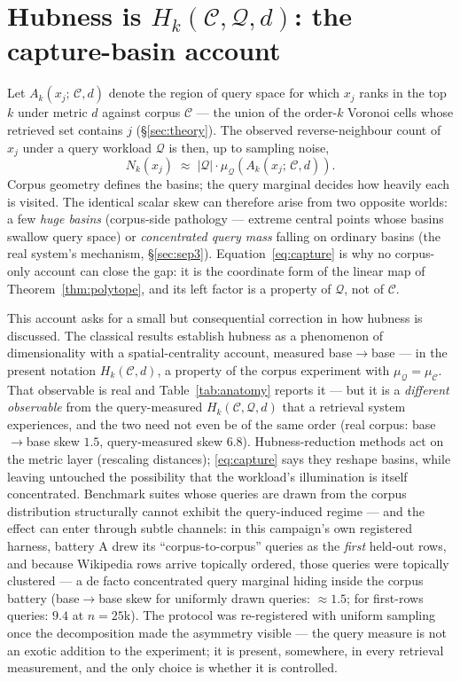 \documentclass[11pt]{article}
\newcommand{\muC}{\mu_{\mathcal{C}}}
\newcommand{\muQ}{\mu_{\mathcal{Q}}}
\newcommand{\capture}[1]{A_k(#1;\,\mathcal{C},d)}
\begin{document}
\section{Hubness is $H_k(\mathcal{C},\mathcal{Q},d)$: the capture-basin account}
\label{sec:hubness}

Let $\capture{x_j}$ denote the region of query space for which $x_j$ ranks in
the top $k$ under metric $d$ against corpus $\mathcal{C}$ --- the union of the
order-$k$ Voronoi cells whose retrieved set contains $j$
(\S\ref{sec:theory}). The observed reverse-neighbour count of $x_j$ under a
query workload $\mathcal{Q}$ is then, up to sampling noise,
\begin{equation}
N_k(x_j) \;\approx\; |\mathcal{Q}| \cdot \muQ\!\left(\capture{x_j}\right).
\label{eq:capture}
\end{equation}
Corpus geometry defines the basins; the query marginal decides how heavily
each is visited. The identical scalar skew can therefore arise from two
opposite worlds: a few \emph{huge basins} (corpus-side pathology --- extreme
central points whose basins swallow query space) or \emph{concentrated query
mass} falling on ordinary basins (the real system's mechanism,
\S\ref{sec:sep3}). Equation~\eqref{eq:capture} is why no corpus-only account
can close the gap: it is the coordinate form of the linear map of
Theorem~\ref{thm:polytope}, and its left factor is a property of
$\mathcal{Q}$, not of $\mathcal{C}$.

This account asks for a small but consequential correction in how hubness is
discussed. The classical results \cite{radovanovic10} establish hubness as a
phenomenon of dimensionality with a spatial-centrality account, measured
base$\to$base --- in the present notation $H_k(\mathcal{C},d)$, a property of
the corpus experiment with $\muQ = \muC$. That observable is real and
Table~\ref{tab:anatomy} reports it --- but it is a \emph{different
observable} from the query-measured $H_k(\mathcal{C},\mathcal{Q},d)$ that a
retrieval system experiences, and the two need not even be of the same order
(real corpus: base$\to$base skew $1.5$, query-measured skew $6.8$).
Hubness-reduction methods \cite{schnitzer12,zelnik04} act on the metric layer
(rescaling distances); \eqref{eq:capture} says they reshape basins, while
leaving untouched the possibility that the workload's illumination is itself
concentrated. Benchmark suites whose queries are drawn from the corpus
distribution \cite{aumuller20} structurally cannot exhibit the query-induced
regime --- and the effect can enter through subtle channels: in this
campaign's own registered harness, battery A drew its ``corpus-to-corpus''
queries as the \emph{first} held-out rows, and because Wikipedia rows arrive
topically ordered, those queries were topically clustered --- a de facto
concentrated query marginal hiding inside the corpus battery (base$\to$base
skew for uniformly drawn queries: $\approx 1.5$; for first-rows queries:
$9.4$ at $n=25$k). The protocol was re-registered with uniform sampling once
the decomposition made the asymmetry visible --- the query measure is not an
exotic addition to the experiment; it is present, somewhere, in every
retrieval measurement, and the only choice is whether it is controlled.
\end{document}
